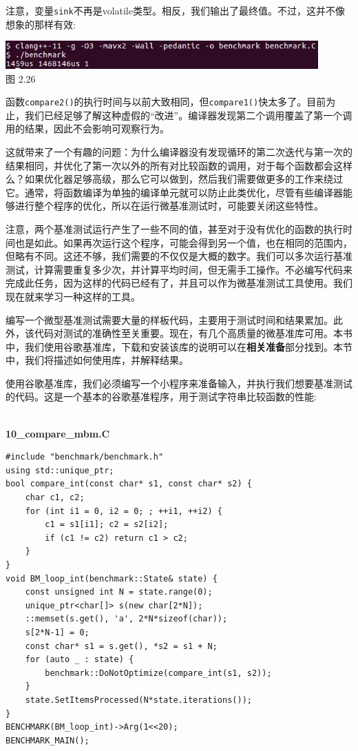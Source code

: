 注意，变量\texttt{sink}不再是volatile类型。相反，我们输出了最终值。不过，这并不像想象的那样有效:

\begin{center}
\includegraphics[width=0.9\textwidth]{content/1/chapter2/images/26.jpg}\\
图 2.26
\end{center}

函数\texttt{compare2()}的执行时间与以前大致相同，但\texttt{compare1()}快太多了。目前为止，我们已经足够了解这种虚假的“改进”。编译器发现第二个调用覆盖了第一个调用的结果，因此不会影响可观察行为。

这就带来了一个有趣的问题：为什么编译器没有发现循环的第二次迭代与第一次的结果相同，并优化了第一次以外的所有对比较函数的调用，对于每个函数都会这样么？如果优化器足够高级，那么它可以做到，然后我们需要做更多的工作来绕过它。通常，将函数编译为单独的编译单元就可以防止此类优化，尽管有些编译器能够进行整个程序的优化，所以在运行微基准测试时，可能要关闭这些特性。

注意，两个基准测试运行产生了一些不同的值，甚至对于没有优化的函数的执行时间也是如此。如果再次运行这个程序，可能会得到另一个值，也在相同的范围内，但略有不同。这还不够，我们需要的不仅仅是大概的数字。我们可以多次运行基准测试，计算需要重复多少次，并计算平均时间，但无需手工操作。不必编写代码来完成此任务，因为这样的代码已经有了，并且可以作为微基准测试工具使用。我们现在就来学习一种这样的工具。


编写一个微型基准测试需要大量的样板代码，主要用于测试时间和结果累加。此外，该代码对测试的准确性至关重要。现在，有几个高质量的微基准库可用。本书中，我们使用谷歌基准库，下载和安装该库的说明可以在\textbf{相关准备}部分找到。本节中，我们将描述如何使用库，并解释结果。

使用谷歌基准库，我们必须编写一个小程序来准备输入，并执行我们想要基准测试的代码。这是一个基本的谷歌基准程序，用于测试字符串比较函数的性能:

\hspace*{\fill} \\ %
\noindent
\textbf{10\_compare\_mbm.C}
\begin{lstlisting}[style=styleCXX]
#include "benchmark/benchmark.h"
using std::unique_ptr;
bool compare_int(const char* s1, const char* s2) {
	char c1, c2;
	for (int i1 = 0, i2 = 0; ; ++i1, ++i2) {
		c1 = s1[i1]; c2 = s2[i2];
		if (c1 != c2) return c1 > c2;
	}
}
void BM_loop_int(benchmark::State& state) {
	const unsigned int N = state.range(0);
	unique_ptr<char[]> s(new char[2*N]);
	::memset(s.get(), 'a', 2*N*sizeof(char));
	s[2*N-1] = 0;
	const char* s1 = s.get(), *s2 = s1 + N;
	for (auto _ : state) {
		benchmark::DoNotOptimize(compare_int(s1, s2));
	}
	state.SetItemsProcessed(N*state.iterations());
}
BENCHMARK(BM_loop_int)->Arg(1<<20);
BENCHMARK_MAIN();
\end{lstlisting}

